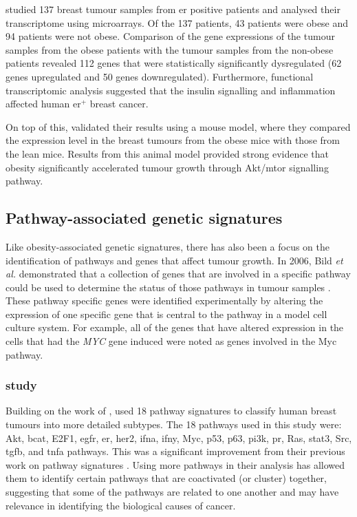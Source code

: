 \citet{Fuentes-Mattei2014} studied 137 breast tumour samples from \gls{er} positive patients and analysed their transcriptome using microarrays.
Of the 137 patients, 43 patients were obese and 94 patients were not obese.
Comparison of the gene expressions of the tumour samples from the obese patients with the tumour samples from the non-obese patients revealed 112 genes that were statistically significantly dysregulated (62 genes upregulated and 50 genes downregulated).
Furthermore, functional transcriptomic analysis suggested that the insulin signalling and inflammation affected human \gls{er}$^+$ breast cancer.

On top of this, \citet{Fuentes-Mattei2014} validated their results using a mouse model, where they compared the expression level in the breast tumours from the obese mice with those from the lean mice.
Results from this animal model provided strong evidence that obesity significantly accelerated tumour growth through Akt/\gls{mtor} signalling pathway.

\subsection{Pathway-associated genetic signatures}
\label{sub:pathway_associated_genetic_signatures}

Like obesity-associated genetic signatures, there has also been a focus on the identification of pathways and genes that affect tumour growth.
In 2006, Bild \textit{et al.} demonstrated that a collection of genes that are involved in a specific pathway could be used to determine the status of those pathways in tumour samples \citep{Bild2006}.
These pathway specific genes were identified experimentally by altering the expression of one specific gene that is central to the pathway in a model cell culture system.
For example, all of the genes that have altered expression in the cells that had  the \textit{MYC} gene induced were noted as genes involved in the Myc pathway.

\vspace{-2mm}

\subsubsection{\citet{Gatza2010a} study}
\label{ssub:gatza_study}

Building on the work of \citet{Bild2006}, \citet{Gatza2010a} used 18 pathway signatures to classify human breast tumours into more detailed subtypes.
The 18 pathways used in this study were: Akt, \gls{bcat}, E2F1, \gls{egfr}, \gls{er}, \gls{her2}, \gls{ifna}, \gls{ifny}, Myc, p53, p63, \gls{pi3k}, \gls{pr}, Ras, \gls{stat3}, Src, \gls{tgfb}, and \gls{tnfa} pathways.
This was a significant improvement from their previous work on pathway signatures \citep{Bild2006,Bild2009}.
Using more pathways in their analysis has allowed them to identify certain pathways that are coactivated (or cluster) together, suggesting that some of the pathways are related to one another and may have relevance in identifying the biological causes of cancer.

